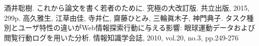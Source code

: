 \begin{thebibliography}{99}
酒井聡樹.
これから論文を書く若者のために.
究極の大改訂版.
共立出版, 2015, 299p.
高久雅生, 江草由佳, 寺井仁, 齋藤ひとみ, 三輪眞木子, 神門典子.
タスク種別とユーザ特性の違いがWeb情報探索行動に与える影響: 眼球運動データおよび閲覧行動ログを用いた分析.
情報知識学会誌, 2010, vol.20, no.3, pp.249-276
\end{thebibliography}